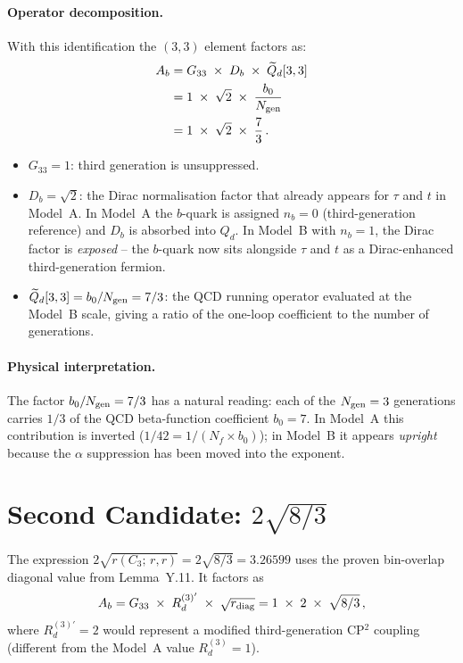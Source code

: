 \documentclass[11pt]{article}
\begin{document}
\paragraph{Operator decomposition.}
With this identification the $(3,3)$ element factors as:
\begin{align}
  A_b &= G_{33}\;\times\; D_b\;\times\; \widetilde{Q}_d[3,3] \notag\\
      &= 1\;\times\;\sqrt{2}\;\times\;\frac{b_0}{N_{\rm gen}} \notag\\
      &= 1\;\times\;\sqrt{2}\;\times\;\frac{7}{3}\,.
\end{align}

\begin{itemize}
\item $G_{33} = 1$: third generation is unsuppressed.
\item $D_b = \sqrt{2}$: the Dirac normalisation factor that already
  appears for $\tau$ and $t$ in Model~A.  In Model~A the $b$-quark
  is assigned $n_b = 0$ (third-generation reference) and $D_b$ is
  absorbed into $Q_d$.  In Model~B with $n_b = 1$, the Dirac factor
  is \emph{exposed} -- the $b$-quark now sits alongside $\tau$ and $t$
  as a Dirac-enhanced third-generation fermion.
\item $\widetilde{Q}_d[3,3] = b_0/N_{\rm gen} = 7/3$: the QCD running
  operator evaluated at the Model~B scale, giving a ratio of the
  one-loop coefficient to the number of generations.
\end{itemize}

\paragraph{Physical interpretation.}
The factor $b_0/N_{\rm gen} = 7/3$ has a natural reading: each of the
$N_{\rm gen} = 3$ generations carries $1/3$ of the QCD beta-function
coefficient $b_0 = 7$.  In Model~A this contribution is inverted
($1/42 = 1/(N_f \times b_0)$); in Model~B it appears \emph{upright}
because the $\alpha$ suppression has been moved into the exponent.

\section{Second Candidate: $2\sqrt{8/3}$}

The expression $2\sqrt{r(C_3;\,r,r)} = 2\sqrt{8/3} = 3.26599$ uses
the proven bin-overlap diagonal value from Lemma~Y.11.  It factors as
\begin{equation}
  A_b = G_{33}\;\times\; R_d^{(3)'}\;\times\;\sqrt{r_{\rm diag}}
  = 1\;\times\; 2\;\times\;\sqrt{8/3}\,,
\end{equation}
where $R_d^{(3)'} = 2$ would represent a modified third-generation
CP$^2$ coupling (different from the Model~A value $R_d^{(3)} = 1$).
\end{document}

